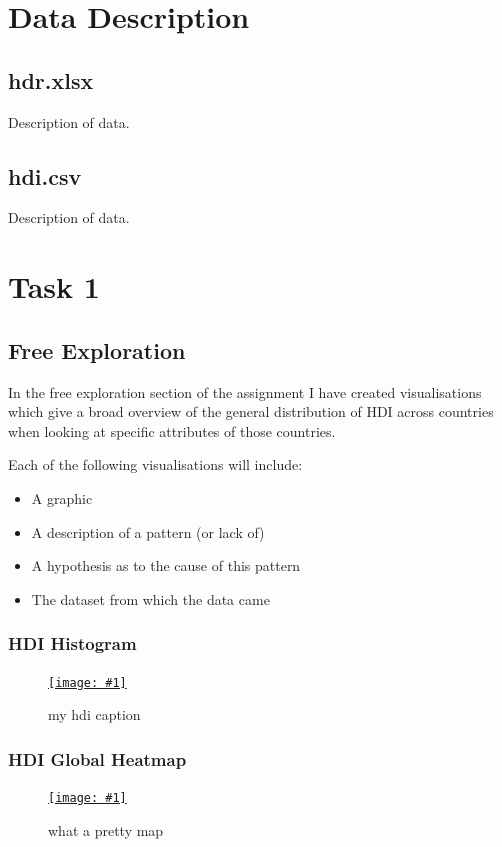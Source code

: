 \documentclass[11pt,a4paper,final]{article}
\newcommand\onlinefig[3]{
\begin{figure}[H]
  \centering
  \href{#3}{\texttt{[image: \#1]}}
  \caption{#2} 
  \label{fig:#1}
\end{figure}
}
\begin{document}
\begin{multicols}{2}
\section{Data Description}
\subsection{hdr.xlsx}
Description of data.
\subsection{hdi.csv}
Description of data.


\section{Task 1}
\subsection{Free Exploration}
In the free exploration section of the assignment I have created visualisations which give a broad overview of the general distribution of HDI across countries when looking at specific attributes of those countries.

Each of the following visualisations will include:

\begin{itemize}
	\item A graphic
	\item A description of a pattern (or lack of)
	\item A hypothesis as to the cause of this pattern
	\item The dataset from which the data came
\end{itemize}

\subsubsection{HDI Histogram}
\onlinefig{hdi_histogram}{my hdi caption}{https://public.tableau.com/views/CS3205-HDI/Sheet6?:language=en-GB&:display_count=n&:origin=viz_share_link}

\subsubsection{HDI Global Heatmap}
\onlinefig{hdi_global_heatmap}{what a pretty map}{https://public.tableau.com/views/CS3205-HDI/Sheet3?:language=en-GB&:display_count=n&:origin=viz_share_link}


\end{multicols}
\end{document}
